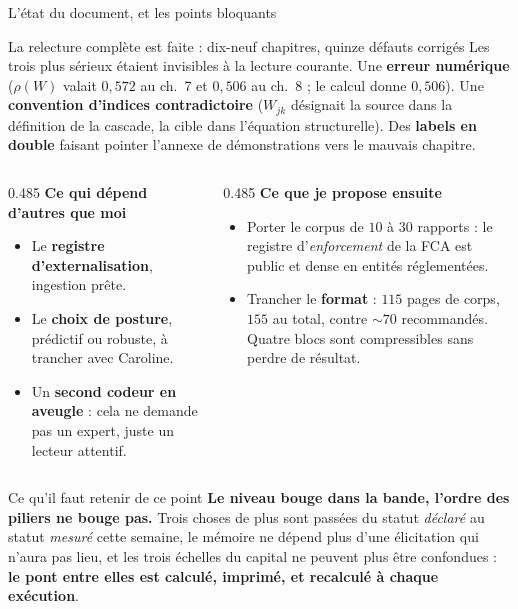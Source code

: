 \documentclass[11pt]{beamer}
\begin{document}


\begin{frame}{L'état du document, et les points bloquants}
\scriptsize
\begin{block}{La relecture complète est faite : dix-neuf chapitres, quinze défauts corrigés}
Les trois plus sérieux étaient invisibles à la lecture courante. Une \textbf{erreur numérique}
($\rho(W)$ valait $0{,}572$ au ch.~7 et $0{,}506$ au ch.~8 ; le calcul donne $0{,}506$). Une
\textbf{convention d'indices contradictoire} ($W_{jk}$ désignait la source dans la définition
de la cascade, la cible dans l'équation structurelle). Des \textbf{labels en double} faisant
pointer l'annexe de démonstrations vers le mauvais chapitre.
\end{block}
\begin{columns}[t]
\begin{column}{0.485\linewidth}
\textbf{Ce qui dépend d'autres que moi}
\begin{itemize}\itemsep0pt
\item Le \textbf{registre d'externalisation}, ingestion prête.
\item Le \textbf{choix de posture}, prédictif ou robuste, à trancher avec Caroline.
\item Un \textbf{second codeur en aveugle} : cela ne demande pas un expert, juste un lecteur
      attentif.
\end{itemize}
\end{column}
\begin{column}{0.485\linewidth}
\textbf{Ce que je propose ensuite}
\begin{itemize}\itemsep0pt
\item Porter le corpus de $10$ à $30$ rapports : le registre d'\emph{enforcement} de la FCA
      est public et dense en entités réglementées.
\item Trancher le \textbf{format} : $115$ pages de corps, $155$ au total, contre $\sim70$
      recommandés. Quatre blocs sont compressibles sans perdre de résultat.
\end{itemize}
\end{column}
\end{columns}
\vspace{1mm}
\begin{block}{Ce qu'il faut retenir de ce point}
\textbf{Le niveau bouge dans la bande, l'ordre des piliers ne bouge pas.} Trois choses de plus
sont passées du statut \emph{déclaré} au statut \emph{mesuré} cette semaine, le mémoire ne
dépend plus d'une élicitation qui n'aura pas lieu, et les trois échelles du capital ne peuvent
plus être confondues : \textbf{le pont entre elles est calculé, imprimé, et recalculé à chaque
exécution}.
\end{block}
\end{frame}
\end{document}
